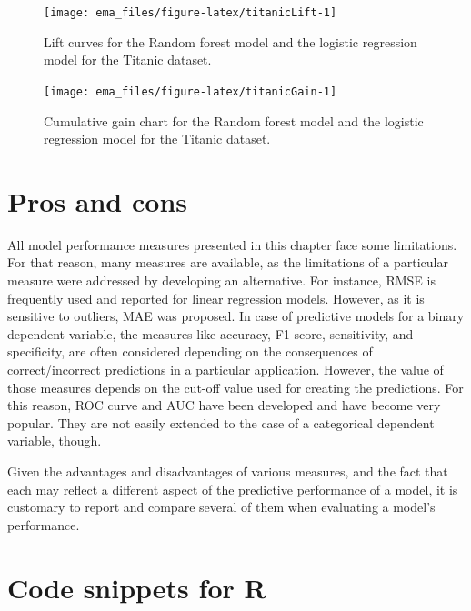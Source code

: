 \documentclass[]{krantz}
\begin{document}
\begin{figure}

{\centering \texttt{[image: ema\_files/figure-latex/titanicLift-1]} 

}

\caption{Lift curves for the Random forest model and the logistic regression model for the Titanic dataset.}\label{fig:titanicLift}
\end{figure}

\begin{figure}

{\centering \texttt{[image: ema\_files/figure-latex/titanicGain-1]} 

}

\caption{Cumulative gain chart for the Random forest model and the logistic regression model for the Titanic dataset.}\label{fig:titanicGain}
\end{figure}

\hypertarget{modelPerformanceProsCons}{%
\section{Pros and cons}\label{modelPerformanceProsCons}}

All model performance measures presented in this chapter face some limitations. For that reason, many measures are available, as the limitations of a particular measure were addressed by developing an alternative. For instance, RMSE is frequently used and reported for linear regression models. However, as it is sensitive to outliers, MAE was proposed. In case of predictive models for a binary dependent variable, the measures like accuracy, F1 score, sensitivity, and specificity, are often considered depending on the consequences of correct/incorrect predictions in a particular application. However, the value of those measures depends on the cut-off value used for creating the predictions. For this reason, ROC curve and AUC have been developed and have become very popular. They are not easily extended to the case of a categorical dependent variable, though.

Given the advantages and disadvantages of various measures, and the fact that each may reflect a different aspect of the predictive performance of a model, it is customary to report and compare several of them when evaluating a model's performance.

\hypertarget{modelPerformanceR}{%
\section{Code snippets for R}\label{modelPerformanceR}}
\end{document}
